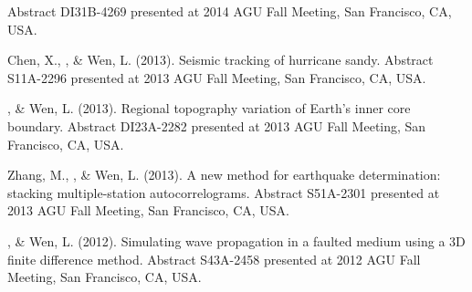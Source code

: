 \begin{etaremune}
    Abstract DI31B-4269 presented at 2014 AGU Fall Meeting, San Francisco, CA, USA.
\item
    Chen, X., \Tian, \& Wen, L. (2013).
    Seismic tracking of hurricane sandy.
    Abstract S11A-2296 presented at 2013 AGU Fall Meeting, San Francisco, CA, USA.
\item
    \Tian, \& Wen, L. (2013).
    Regional topography variation of Earth's inner core boundary.
    Abstract DI23A-2282 presented at 2013 AGU Fall Meeting, San Francisco, CA, USA.
\item
    Zhang, M., \Tian, \& Wen, L. (2013).
    A new method for earthquake determination: stacking multiple-station autocorrelograms.
    Abstract S51A-2301 presented at 2013 AGU Fall Meeting, San Francisco, CA, USA.
\item
    \Tian, \& Wen, L. (2012).
    Simulating wave propagation in a faulted medium using a 3D finite difference method.
    Abstract S43A-2458 presented at 2012 AGU Fall Meeting, San Francisco, CA, USA.
\end{etaremune}
